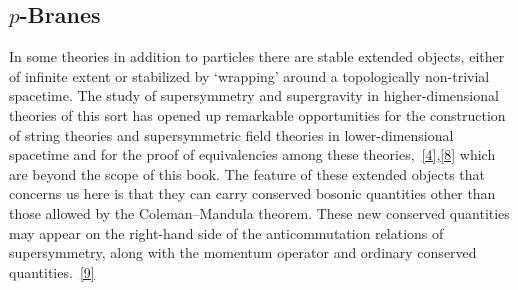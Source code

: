 
\subsection{\texorpdfstring{$p$}{p}-Branes}

In some theories in addition to particles there are stable extended
objects, either of infinite extent or stabilized by `wrapping' around a
topologically non-trivial spacetime. The study of supersymmetry and
supergravity in higher-dimensional theories of this sort has opened up
remarkable opportunities for the construction of string theories and
supersymmetric field theories in lower-dimensional spacetime and for the
proof of equivalencies among these
theories,~\hyperref[ch32-ref-4]{[4]},\hyperref[ch32-ref-8]{[8]} which are
beyond the scope of this book. The feature of these extended objects that
concerns us here is that they can carry conserved bosonic quantities other
than those allowed by the Coleman--Mandula theorem. These new conserved
quantities may appear on the right-hand side of the anticommutation
relations of supersymmetry, along with the momentum operator and ordinary
conserved quantities.~\hyperref[ch32-ref-9]{[9]}

